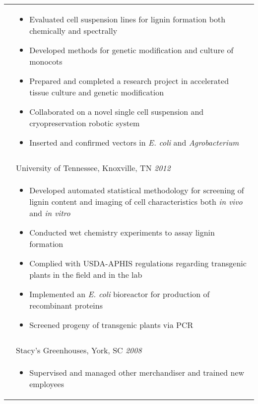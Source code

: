 \documentclass[10pt]{article}
\begin{document}
\begin{minipage}[ht]{.75\linewidth}
\begin{tabularx}{\linewidth}{p{1.8cm}M}
       & \begin{itemize}[topsep=-12pt,parsep=0em]
            \setlength\itemsep{0em}
            \item Evaluated cell suspension lines for lignin formation both chemically and spectrally
            \item Developed methods for genetic modification and culture of monocots
            \item Prepared and completed a research project in accelerated tissue culture and genetic modification
            \item Collaborated on a novel single cell suspension and cryopreservation robotic system
            \item {Inserted and confirmed vectors in \textit{E. coli} and \textit{Agrobacterium}}
         \end{itemize} \\
       &  \\
       & University of Tennessee, Knoxville, TN \textit{2012 } \\
       & \begin{itemize}[topsep=-12pt,parsep=0em]
            \setlength\itemsep{0em}
            \item Developed automated statistical methodology for screening of lignin content and imaging of cell characteristics both \textit{in vivo} and \textit{in vitro}
            \item Conducted wet chemistry experiments to assay lignin formation
            \item Complied with USDA-APHIS regulations regarding transgenic plants in the field and in the lab
            \item Implemented an \textit{E. coli} bioreactor for production of recombinant proteins
            \item Screened progeny of transgenic plants via PCR
         \end{itemize} \\
      &  \\
      & Stacy's Greenhouses, York, SC \textit{2008 } \\
      &
         \begin{itemize}[topsep=-12pt,parsep=0em]
           \setlength\itemsep{0em}
           \item Supervised and managed other merchandiser and trained new employees

\end{itemize}
\end{tabularx}
\end{minipage}
\end{document}
